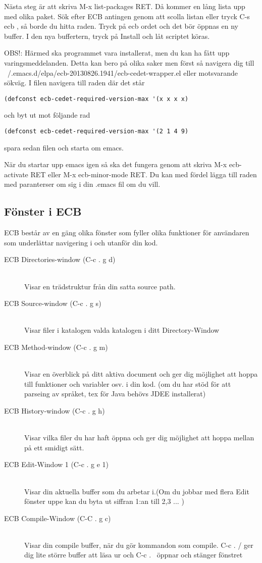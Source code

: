 \documentclass[12pt]{article} %
\begin{document}
Nästa steg är att skriva M-x list-packages RET. Då kommer en lång lista upp med olika paket. Sök efter ECB antingen genom att scolla listan eller tryck C-s ecb , så borde du hitta raden. Tryck på ecb ordet och det bör öppnas en ny buffer. I den nya buffertern, tryck på Install och låt scriptet köras.


OBS!: Härmed ska programmet vara installerat, men du kan ha fått upp varingsmeddelanden. Detta kan bero på olika saker men först så navigera dig till ~/.emacs.d/elpa/ecb-20130826.1941/ecb-cedet-wrapper.el eller motsvarande sökväg. I filen navigera till raden där det står \begin{lstlisting}
(defconst ecb-cedet-required-version-max '(x x x x)
\end{lstlisting}
och byt ut mot följande rad
\begin{lstlisting}
(defconst ecb-cedet-required-version-max '(2 1 4 9)
\end{lstlisting}
spara sedan filen och starta om emacs.

När du startar upp emacs igen så ska det fungera genom att skriva M-x ecb-activate RET eller M-x ecb-minor-mode RET. Du kan med fördel lägga till raden med paranterser om sig i din .emacs fil om du vill.
\newpage
\subsection{Fönster i ECB}
ECB består av en gäng olika fönster som fyller olika funktioner för användaren som underlättar navigering i och utanför din kod.
\begin{description}
\item [ECB Directories-window (C-c . g d)] \hfill \\
  Visar en trädstruktur från din satta source path.
\item [ECB Source-window (C-c . g s)] \hfill \\
  Visar filer i katalogen valda katalogen i ditt Directory-Window
\item [ECB Method-window (C-c . g m)] \hfill \\
  Visar en överblick på ditt aktiva document och ger dig möjlighet att hoppa till funktioner och variabler osv. i din kod. (om du har stöd för att parseing av språket, tex för Java behövs JDEE installerat)  
\item [ECB History-window (C-c . g h)] \hfill \\
  Visar vilka filer du har haft öppna och ger dig möjlighet att hoppa mellan på ett smidigt sätt.
\item [ECB Edit-Window 1 (C-c . g e 1)] \hfill \\
  Visar din aktuella buffer som du arbetar i.(Om du jobbar med flera Edit fönster uppe kan du byta ut siffran 1:an till 2,3 ... )
\item [ECB Compile-Window (C-C . g c)] \hfill \\
  Visar din compile buffer, när du gör kommandon som compile. C-c . / ger dig lite större buffer att läsa ur och C-c . \ öppnar och stänger fönstret
\end{description}
\end{document}
